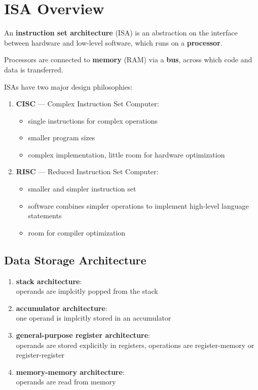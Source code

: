 \section{ISA Overview}

An \textbf{instruction set architecture} (ISA) is an abstraction on the interface between
hardware and low-level software, which runs on a \textbf{processor}.

Processors are connected to \textbf{memory} (RAM) via a \textbf{bus},
across which code and data is transferred.

ISAs have two major design philosophies:

\begin{enumerate}[itemsep=0.5em]
    \item \textbf{CISC} --- Complex Instruction Set Computer:\vspace{0.3em}
    \begin{itemize}
        \item single instructions for complex operations
        \item smaller program sizes
        \item complex implementation, little room for hardware optimization
    \end{itemize}
    \item \textbf{RISC} --- Reduced Instruction Set Computer:\vspace{0.3em}
    \begin{itemize}
        \item smaller and simpler instruction set
        \item software combines simpler operations to implement high-level language statements
        \item room for compiler optimization
    \end{itemize}
\end{enumerate}

\subsection{Data Storage Architecture}
\begin{enumerate}[itemsep=0.5em]
    \item \textbf{stack architecture}: \\ operands are implcitly popped from the stack
    \item \textbf{accumulator architecture}: \\ one operand is implcitly stored in an accumulator
    \item \textbf{general-purpose register architecture}: \\ operands are stored explicitly in registers, operations are register-memory or register-register
    \item \textbf{memory-memory architecture}: \\ operands are read from memory
\end{enumerate}

